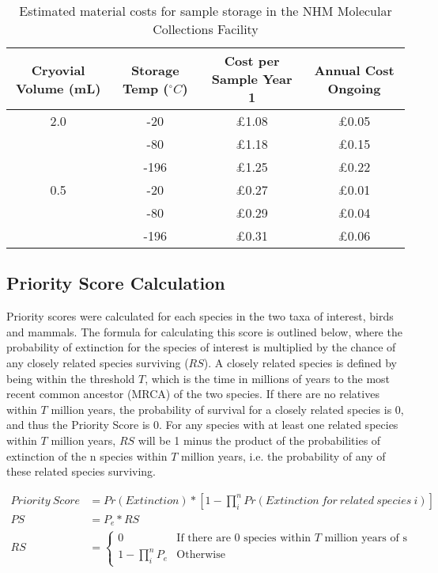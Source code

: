 \documentclass[10pt]{article}
\begin{document}
	\begin{table}
		\begin{tabular}{|c|c|c|c|}
			\hline
			Cryovial Volume (mL) & Storage Temp ($^\circ C$) & Cost per Sample Year 1 & Annual Cost Ongoing \\
			\hline
			2.0 & -20 & £1.08 & £0.05 \\
			 & -80 & £1.18 & £0.15 \\
			 & -196 & £1.25 & £0.22 \\
			\hline
			0.5 & -20 & £0.27 & £0.01 \\
			 & -80 & £0.29 & £0.04 \\
			 & -196 & £0.31 & £0.06 \\
			\hline
		\end{tabular}
		\caption{Estimated material costs for sample storage in the NHM Molecular Collections Facility}
	\end{table}

	\subsection{Priority Score Calculation}\label{ps_method}
	Priority scores were calculated for each species in the two taxa of interest, birds and mammals. The formula for calculating this score is outlined below, where the probability of extinction
	for the species of interest is multiplied by the chance of any closely related species surviving
	($RS$).
	A closely related species is defined by being within the threshold $T$, which is the time in 
	millions of years to the most recent common ancestor (MRCA) of the two species. If there are no
	relatives within $T$ million years, the probability of survival for a closely related species is
	0, and thus the Priority Score is 0. For any species with at least one related species within $T$ 
	million years, $RS$ will be 1 minus the product of the probabilities of extinction of the n
	species within $T$ million years, i.e. the probability of any of these related species
	surviving.
	
	\begin{align}
		Priority\ Score &= Pr(Extinction) * [1 - \prod_{i}^{n}{Pr(Extinction\ for\ related\ species\ i)}] \\
		PS &= P_e * RS \\
		RS &= \begin{cases}
			0 & \text{If there are 0 species within $T$ million years of s} \\
			1 - \prod_{i}^{n}{P_e} & \text{Otherwise}
		\end{cases}
	\end{align}
\end{document}
